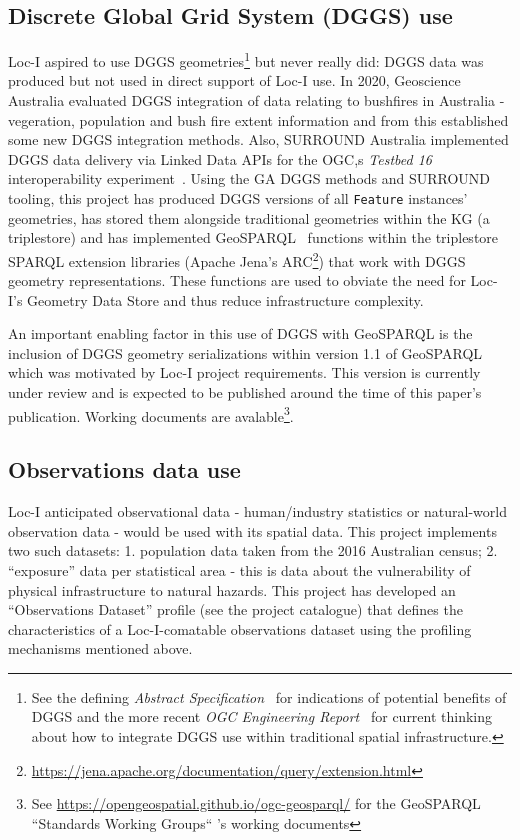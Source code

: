 \documentclass[runningheads]{llncs}
\begin{document}
\subsection{Discrete Global Grid System (DGGS) use}
Loc-I aspired to use DGGS geometries\footnote{See the defining \textit{Abstract Specification}~\cite{purss_topic_2017} for indications of potential benefits of 
DGGS and the more recent \textit{OGC Engineering Report}~\cite{gibb_ogc_2021} for current thinking about how to integrate DGGS use within traditional spatial 
infrastructure.} but never really did: DGGS data was produced but not used in direct support of Loc-I use. In 2020, Geoscience Australia evaluated DGGS integration of data
relating to bushfires in Australia - vegeration, population and bush fire extent information and from this established some new DGGS integration methods. Also, SURROUND Australia
implemented DGGS data delivery via Linked Data APIs for the OGC,s \textit{Testbed 16} interoperability experiment~\cite{gibb_ogc_2021}.
Using the GA DGGS methods and SURROUND tooling, this project has produced DGGS versions of all \texttt{Feature} instances' 
geometries, has stored them alongside traditional geometries within the KG (a triplestore) and has implemented GeoSPARQL~\cite{open2012ogc} functions
within the triplestore SPARQL extension libraries (Apache Jena's ARC\footnote{\url{https://jena.apache.org/documentation/query/extension.html}}) that work with 
DGGS geometry representations. These functions are used to obviate the need for Loc-I's Geometry Data Store and thus reduce infrastructure complexity.

An important enabling factor in this use of DGGS with GeoSPARQL is the inclusion of DGGS geometry serializations within version 1.1 of GeoSPARQL which was motivated
by Loc-I project requirements. This version is currently under review and is expected to be published around the time of this paper's publication. Working documents 
are avalable\footnote{See \url{https://opengeospatial.github.io/ogc-geosparql/} for the GeoSPARQL ``Standards Working Groups`` 's working documents}.

\subsection{Observations data use}
Loc-I anticipated observational data - human/industry statistics or natural-world observation data - would be used with its spatial data. This project
implements two such datasets: 1. population data taken from the 2016 Australian census; 2. ``exposure'' data per statistical area - this is data about the vulnerability
of physical infrastructure to natural hazards. This project has developed an ``Observations Dataset'' profile (see the project catalogue) that defines the characteristics of a Loc-I-comatable 
observations dataset using the profiling mechanisms mentioned above.
\end{document}
